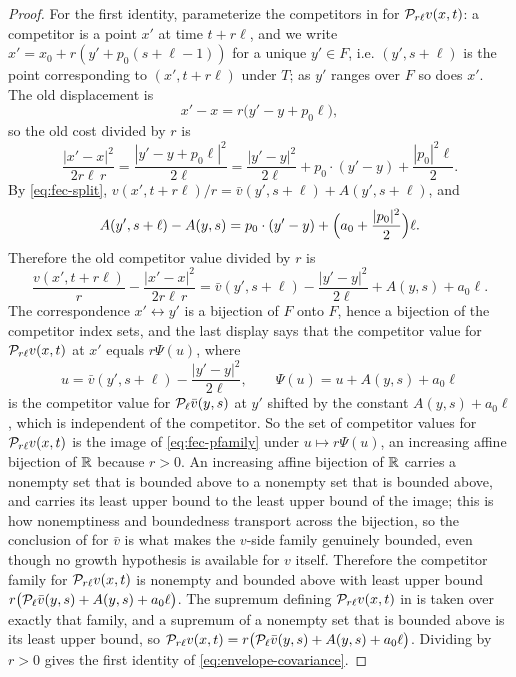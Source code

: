 \begin{proof}
For the first identity, parameterize the competitors in  for
$\mathcal{P}_{r\ell}v(x,t)$: a competitor is a point $x'$ at time $t+r\ell$, and we
write $x'=x_0+r(y'+p_0(s+\ell-1))$ for a unique $y'\in F$, i.e. $(y',s+\ell)$ is
the point corresponding to $(x',t+r\ell)$ under $T$; as $y'$ ranges over $F$ so
does $x'$. The old displacement is
\[
  x'-x=r\bigl(y'-y+p_0\ell\bigr),
\]
so the old cost divided by $r$ is
\[
  \frac{|x'-x|^2}{2r\ell\,r}=\frac{|y'-y+p_0\ell|^2}{2\ell}
    =\frac{|y'-y|^2}{2\ell}+p_0\cdot(y'-y)+\frac{|p_0|^2\ell}{2}.
\]
By \eqref{eq:fec-split}, $v(x',t+r\ell)/r=\bar v(y',s+\ell)+A(y',s+\ell)$, and
\[
  A(y',s+\ell)-A(y,s)=p_0\cdot(y'-y)+\Bigl(a_0+\frac{|p_0|^2}{2}\Bigr)\ell .
\]
Therefore the old competitor value divided by $r$ is
\[
  \frac{v(x',t+r\ell)}{r}-\frac{|x'-x|^2}{2r\ell\,r}
   =\bar v(y',s+\ell)-\frac{|y'-y|^2}{2\ell}+A(y,s)+a_0\ell .
\]
The correspondence $x'\leftrightarrow y'$ is a bijection of $F$ onto $F$, hence
a bijection of the competitor index sets, and the last display says that the
competitor value for $\mathcal{P}_{r\ell}v(x,t)$ at $x'$ equals $r\Psi(u)$, where
\[
  u=\bar v(y',s+\ell)-\frac{|y'-y|^2}{2\ell},
  \qquad \Psi(u)=u+A(y,s)+a_0\ell
\]
is the competitor value for $\mathcal{P}_\ell\bar v(y,s)$ at $y'$ shifted by the
constant $A(y,s)+a_0\ell$, which is independent of the competitor. So the set of
competitor values for $\mathcal{P}_{r\ell}v(x,t)$ is the image of
\eqref{eq:fec-pfamily} under $u\mapsto r\Psi(u)$, an increasing affine bijection
of $\mathbb{R}$ because $r>0$. An increasing affine bijection of $\mathbb{R}$ carries a nonempty
set that is bounded above to a nonempty set that is bounded above, and carries
its least upper bound to the least upper bound of the image; this is how
nonemptiness and boundedness transport across the bijection, so the conclusion
of  for $\bar v$ is what makes the $v$-side
family genuinely bounded, even though no growth hypothesis is available for $v$
itself. Therefore the competitor family for $\mathcal{P}_{r\ell}v(x,t)$ is nonempty
and bounded above with least upper bound
$r\bigl(\mathcal{P}_\ell\bar v(y,s)+A(y,s)+a_0\ell\bigr)$. The supremum defining
$\mathcal{P}_{r\ell}v(x,t)$ in  is taken over exactly that family,
and a supremum of a nonempty set that is bounded above is its least upper bound,
so $\mathcal{P}_{r\ell}v(x,t)=r\bigl(\mathcal{P}_\ell\bar v(y,s)+A(y,s)+a_0\ell\bigr)$.
Dividing by $r>0$ gives the first identity of \eqref{eq:envelope-covariance}.


\end{proof}
